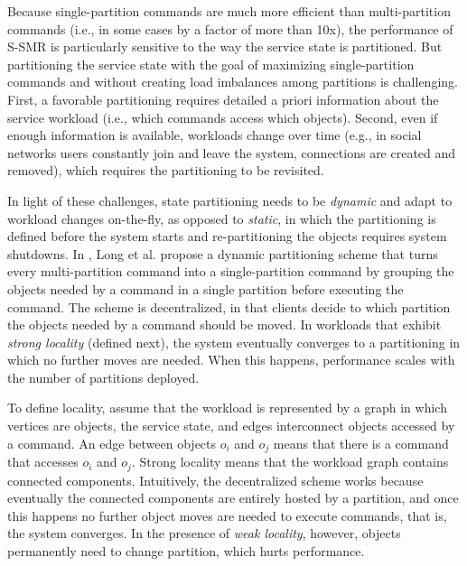 Because single-partition commands are much more efficient than multi-partition commands (i.e., in some cases by a factor of more than 10x), the performance of S-SMR is particularly sensitive to the way the service state is partitioned.
But partitioning the service state with the goal of maximizing single-partition commands and without creating load imbalances among partitions is challenging.
First, a favorable partitioning requires detailed a priori information about the service workload (i.e., which commands access which objects).
Second, even if enough information is available, workloads change over time (e.g., in social networks users constantly join and leave the system, connections are created and removed), which requires the partitioning to be revisited.

In light of these challenges, state partitioning needs to be \emph{dynamic} and adapt to workload changes on-the-fly, as opposed to \emph{static}, in which the partitioning is defined before the system starts and re-partitioning the objects requires system shutdowns.
In \cite{hoang2016}, Long et al. propose a dynamic partitioning scheme that turns every multi-partition command into a single-partition command by grouping the objects needed by a command in a single partition before executing the command.
The scheme is decentralized, in that clients decide to which partition the objects needed by a command should be moved.
In workloads that exhibit \emph{strong locality} (defined next), the system eventually converges to a partitioning in which no further moves are needed.
When this happens, performance scales with the number of partitions deployed.

To define locality, assume that the workload is represented by a graph in which vertices are objects, the service state, and edges interconnect objects accessed by a command. 
An edge between objects $o_i$ and $o_j$ means that there is a command that accesses $o_i$ and $o_j$.
Strong locality means that the workload graph contains connected components.
Intuitively, the decentralized scheme works because eventually the connected components are entirely hosted by a partition, and once this happens no further object moves are needed to execute commands, that is, the system converges.
In the presence of \emph{weak locality}, however, objects permanently need to change partition, which hurts performance.


